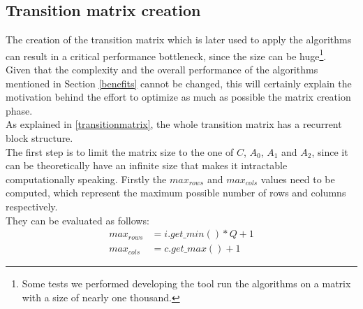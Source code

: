 \subsection{Transition matrix creation} \label{matrixcreation}
The creation of the transition matrix which is later used to apply the algorithms can result in a critical performance bottleneck, since the size can be huge\footnote{Some tests we performed developing the tool run the algorithms on a matrix with a size of nearly one thousand.}.\\ 
Given that the complexity and the overall performance of the algorithms mentioned in Section \ref{benefits} cannot be changed, this will certainly explain the motivation behind the effort to optimize as much as possible the matrix creation phase.\\
As explained in \ref{transitionmatrix}, the whole transition matrix has a recurrent block structure.\\ 
The first step is to limit the matrix size to the one of \( C \), \( A_{0} \), \( A_{1} \) and \( A_{2} \), since it can be theoretically have an infinite size that makes it intractable computationally speaking. Firstly the \( max_{rows} \) and \( max_{cols} \) values need to be computed, which represent the maximum possible number of rows and columns respectively.\\ 
They can be evaluated as follows: 
\begin{equation*}
\begin{split}
  max_{rows} &= i.get\_min() * Q + 1 \\
  max_{cols} &= c.get\_max() + 1
\end{split}
\end{equation*}

